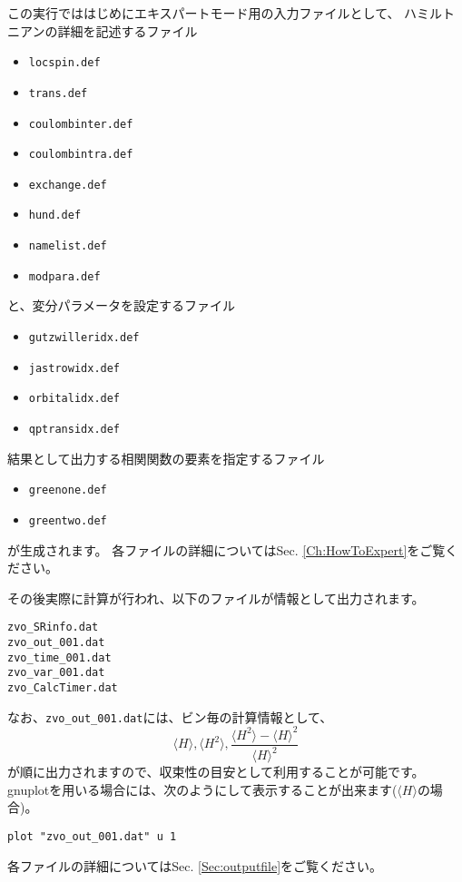 この実行でははじめにエキスパートモード用の入力ファイルとして、
ハミルトニアンの詳細を記述するファイル
\begin{itemize}
\item \verb|locspin.def|
\item \verb|trans.def|
\item \verb|coulombinter.def|
\item \verb|coulombintra.def|
\item \verb|exchange.def|
\item \verb|hund.def|
\item \verb|namelist.def|
\item \verb|modpara.def|
\end{itemize}
と、変分パラメータを設定するファイル
\begin{itemize}
\item \verb|gutzwilleridx.def|
\item \verb|jastrowidx.def|
\item \verb|orbitalidx.def|
\item \verb|qptransidx.def|
\end{itemize}
結果として出力する相関関数の要素を指定するファイル
\begin{itemize}
\item \verb|greenone.def|
\item \verb|greentwo.def|
\end{itemize}
が生成されます。
各ファイルの詳細についてはSec. \ref{Ch:HowToExpert}をご覧ください。

その後実際に計算が行われ、以下のファイルが情報として出力されます。
\\
\begin{minipage}{12cm}
  \begin{screen}
\begin{verbatim}
zvo_SRinfo.dat
zvo_out_001.dat
zvo_time_001.dat
zvo_var_001.dat
zvo_CalcTimer.dat
\end{verbatim}
  \end{screen}
\end{minipage}

なお、\verb|zvo_out_001.dat|には、ビン毎の計算情報として、
\begin{equation}
\langle H \rangle, \langle H^2 \rangle, \frac{\langle H^2 \rangle- \langle H \rangle^2 }{\langle H \rangle^2} \nonumber
\end{equation}
が順に出力されますので、収束性の目安として利用することが可能です。
gnuplotを用いる場合には、次のようにして表示することが出来ます($\langle H \rangle$の場合)。
\begin{verbatim}
plot "zvo_out_001.dat" u 1
\end{verbatim}
各ファイルの詳細についてはSec. \ref{Sec:outputfile}をご覧ください。\\

